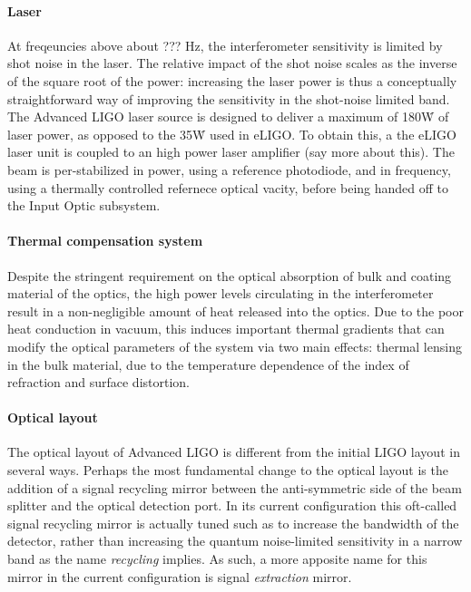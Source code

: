 \paragraph*{Laser}
At freqeuncies above about ??? Hz, the interferometer sensitivity is limited by shot 
noise in the laser. The relative impact of the shot noise scales as the inverse of the 
square root of the power: increasing the laser power is thus a conceptually 
straightforward way of improving the sensitivity in the shot-noise limited band. 
The Advanced LIGO laser source is designed to deliver a maximum of 180\.W of 
laser power, as opposed to the 35\.W used in eLIGO. To obtain this, a the eLIGO 
laser unit is coupled to an high power laser amplifier (say more about this). The 
beam is per-stabilized in power, using a reference photodiode, and in frequency, 
using a thermally controlled refernece optical vacity, before being handed off to the Input Optic subsystem.

\paragraph*{Thermal compensation system}
Despite the stringent requirement on the optical absorption of bulk and coating 
material of the optics, the high power levels circulating in the interferometer result 
in a non-negligible amount of heat released into the optics. Due to the poor heat 
conduction in vacuum, this induces important thermal gradients that can modify 
the optical parameters of the system via two main effects: thermal lensing in the 
bulk material, due to the temperature dependence of the index of refraction  
and surface distortion. 

\paragraph*{Optical layout}
The optical layout of Advanced LIGO is different from the initial LIGO layout in several ways. 
Perhaps the most fundamental change to the optical layout is the addition of a signal recycling 
mirror between the anti-symmetric side of the beam splitter and the optical detection port. 
In its current configuration this oft-called signal recycling mirror is actually tuned such as to 
increase the bandwidth of the detector, rather than increasing the quantum noise-limited sensitivity
in a narrow band as the name \emph{recycling} implies. As such, a more apposite name for this mirror 
in the current configuration is signal \emph{extraction} mirror. 


